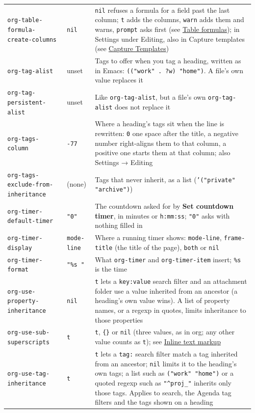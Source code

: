 \documentclass[11pt]{article}
\begin{document}
\begin{center}
\begin{tabular}{lll}
\texttt{org-table-formula-create-columns} & \texttt{nil} & \texttt{nil} refuses a formula for a field past the last column; \texttt{t} adds the columns, \texttt{warn} adds them and warns, \texttt{prompt} asks first (see \hyperref[sec:org7d24a5b]{Table formulas}); in Settings under Editing, also in Capture templates (see \hyperref[sec:org0116725]{Capture Templates})\\[0pt]
\texttt{org-tag-alist} & unset & Tags to offer when you tag a heading, written as in Emacs: \texttt{(("work" . ?w) "home")}. A file's own value replaces it\\[0pt]
\texttt{org-tag-persistent-alist} & unset & Like \texttt{org-tag-alist}, but a file's own \texttt{org-tag-alist} does not replace it\\[0pt]
\texttt{org-tags-column} & \texttt{-77} & Where a heading's tags sit when the line is rewritten: \texttt{0} one space after the title, a negative number right-aligns them to that column, a positive one starts them at that column; also Settings → Editing\\[0pt]
\texttt{org-tags-exclude-from-inheritance} & (none) & Tags that never inherit, as a list (\texttt{'("private" "archive")})\\[0pt]
\texttt{org-timer-default-timer} & \texttt{"0"} & The countdown asked for by \textbf{Set countdown timer}, in minutes or \texttt{h:mm:ss}; \texttt{"0"} asks with nothing filled in\\[0pt]
\texttt{org-timer-display} & \texttt{mode-line} & Where a running timer shows: \texttt{mode-line}, \texttt{frame-title} (the title of the page), \texttt{both} or \texttt{nil}\\[0pt]
\texttt{org-timer-format} & \texttt{"\%s "} & What \texttt{org-timer} and \texttt{org-timer-item} insert; \texttt{\%s} is the time\\[0pt]
\texttt{org-use-property-inheritance} & \texttt{nil} & \texttt{t} lets a \texttt{key:value} search filter and an attachment folder use a value inherited from an ancestor (a heading's own value wins). A list of property names, or a regexp in quotes, limits inheritance to those properties\\[0pt]
\texttt{org-use-sub-superscripts} & \texttt{t} & \texttt{t}, \texttt{\{\}} or \texttt{nil} (three values, as in org; any other value counts as \texttt{t}); see \hyperref[sec:org87db50b]{Inline text markup}\\[0pt]
\texttt{org-use-tag-inheritance} & \texttt{t} & \texttt{t} lets a \texttt{tag:} search filter match a tag inherited from an ancestor; \texttt{nil} limits it to the heading's own tags; a list such as \texttt{("work" "home")} or a quoted regexp such as \texttt{"\textasciicircum{}proj\_"} inherits only those tags. Applies to search, the Agenda tag filters and the tags shown on a heading\\[0pt]

\end{tabular}
\end{center}
\end{document}

